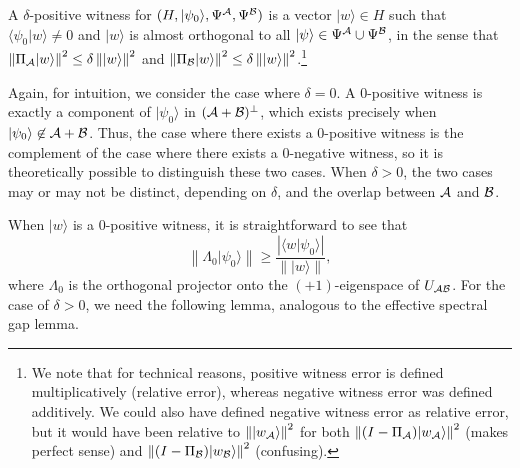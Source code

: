 \documentclass{article}
\def\ket#1{{\lvert}#1\rangle}
\renewcommand{\>}{\rangle}
\newcommand{\<}{\langle}
\renewcommand{\(}{\left(}
\renewcommand{\)}{\right)}
\def\braket#1#2{{{\langle}#1\vert}#2\rangle}
\def\norm#1{\left\| #1 \right\|}
\begin{document}
\begin{definition}\label{def:pos-witness}
A $\delta$-positive witness for $(H,\ket{\psi_0},\Psi^{\cal A},\Psi^{\cal B})$ is a vector $\ket{w}\in H$ such that $\braket{\psi_0}{w}\neq 0$ and $\ket{w}$ is almost orthogonal to all $\ket{\psi}\in \Psi^{\cal A}\cup \Psi^{\cal B}$, in the sense that $\norm{\Pi_{\cal A}\ket{w}}^2\leq \delta\norm{\ket{w}}^2$ and $\norm{\Pi_{\cal B}\ket{w}}^2\leq \delta\norm{\ket{w}}^2$.\footnote{We note that for technical reasons, positive witness error is defined multiplicatively (relative error), whereas negative witness error was defined additively. We could also have defined negative witness error as relative error, but it would have been relative to $\norm{\ket{w_{\cal A}}}^2$ for both $\norm{(I-\Pi_{\cal A})\ket{w_{\cal A}}}^2$ (makes perfect sense) and $\norm{(I-\Pi_{\cal B})\ket{w_{\cal B}}}^2$ (confusing).} 
\end{definition}

Again, for intuition, we consider the case where $\delta=0$. A 0-positive witness is exactly a component of $\ket{\psi_0}$ in $({\cal A}+{\cal B})^\bot$, which exists precisely when $\ket{\psi_0}\not\in {\cal A}+{\cal B}$. Thus, the case where there exists a 0-positive witness is the complement of the case where there exists a 0-negative witness, so it is theoretically possible to distinguish these two cases. When $\delta>0$, the two cases may or may not be distinct, depending on $\delta$, and the overlap between ${\cal A}$ and ${\cal B}$. 

When $\ket{w}$ is a $0$-positive witness, it is straightforward to see that 
\begin{equation*}
\norm{\Lambda_0\ket{\psi_0}} \geq \frac{|\braket{w}{\psi_0}|}{\norm{\ket{w}}},
\end{equation*}
where $\Lambda_0$ is the orthogonal projector onto the $(+1)$-eigenspace of $U_{\cal AB}$. For the case of $\delta>0$, we need the following lemma, analogous to the effective spectral gap lemma.
\end{document}
